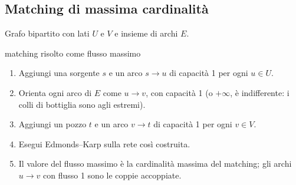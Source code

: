 \documentclass[11pt,a4paper]{article}
\begin{document}
\newpage
\subsection{Matching di massima cardinalità}

Grafo bipartito con lati $U$ e $V$ e insieme di archi $E$.

\begin{ric}{matching risolto come flusso massimo}
\begin{enumerate}
\item Aggiungi una sorgente $s$ e un arco $s \to u$ di capacità 1 per ogni $u \in U$.
\item Orienta ogni arco di $E$ come $u \to v$, con capacità 1 (o $+\infty$, è indifferente:
      i colli di bottiglia sono agli estremi).
\item Aggiungi un pozzo $t$ e un arco $v \to t$ di capacità 1 per ogni $v \in V$.
\item Esegui Edmonds--Karp sulla rete così costruita.
\item Il valore del flusso massimo è la cardinalità massima del matching;
      gli archi $u \to v$ con flusso 1 sono le coppie accoppiate.
\end{enumerate}
\end{ric}
\end{document}
